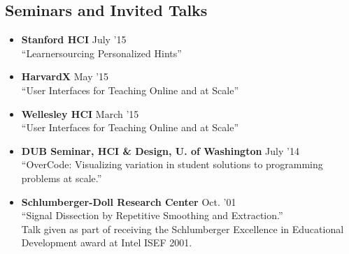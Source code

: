 \documentclass[margin]{res}
\begin{document}
\begin{resume}
\section{Seminars and Invited Talks}

\begin{itemize}[leftmargin=*] \itemsep -2pt
\item {\bf Stanford HCI} \hfill July '15 \\ ``Learnersourcing Personalized Hints''

\item {\bf HarvardX}  \hfill May '15 \\``User Interfaces for Teaching Online and at Scale''

\item {\bf Wellesley HCI}  \hfill March '15 \\``User Interfaces for Teaching Online and at Scale''


\item {\bf DUB Seminar, HCI \& Design, U. of Washington} \hfill July '14 \\``OverCode: Visualizing variation in student solutions to programming problems at scale.''

\item {\bf Schlumberger-Doll Research Center} \hfill Oct. '01 \\``Signal Dissection by Repetitive Smoothing and Extraction.'' \\
Talk given as part of receiving the Schlumberger Excellence in Educational Development award at Intel ISEF 2001.
\end{itemize}





 

\end{resume}
\end{document}
